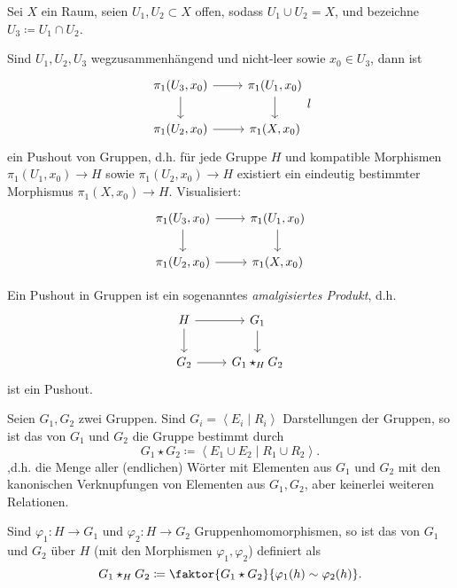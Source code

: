 \begin{theorem*}
    Sei $X$ ein Raum, seien  $U_1,U_2\subset X$ offen, sodass $U_1\cup U_2 = X$, und bezeichne  $U_3 \coloneqq  U_1 \cap U_2$.

    Sind $U_1,U_2,U_3$ wegzusammenhängend und nicht-leer sowie $x_0\in U_3$, dann ist
    \[
    \begin{tikzcd}
        \pi_1(U_3,x_0) \ar[swap]{d}{} \ar{r}{} & \pi_1(U_1,x_0) \ar{d}{} \\
        \pi_1(U_2,x_0) \ar[swap]{r}{} & \pi_1(X,x_0)
    \end{tikzcd}
    l\]
    ein Pushout von Gruppen, d.h. für jede Gruppe $H$ und kompatible Morphismen  $\pi_1(U_1,x_0) \to  H$ sowie $\pi_1(U_2,x_0) \to  H$ existiert ein eindeutig bestimmter Morphismus $\pi_1(X,x_0) \to  H$. Visualisiert:
    \[
    \begin{tikzcd}
        \pi_1(U_3,x_0) \ar[swap]{d}{} \ar{r}{} & \pi_1(U_1,x_0) \ar{d}{} \\
        \pi_1(U_2,x_0) \ar[swap]{r}{} & \pi_1(X,x_0)
    \end{tikzcd}
    \]
\end{theorem*}

\begin{remark}
    Ein Pushout in Gruppen ist ein sogenanntes \textit{amalgisiertes Produkt}, d.h.
    \[
    \begin{tikzcd}
        H \ar[swap]{d}{} \ar{r}{} & G_1 \ar{d}{} \\
        G_2 \ar[swap]{r}{} & G_1 \star_H G_2
    \end{tikzcd}
    \]
    ist ein Pushout.
\end{remark}

\begin{ddefinition}
    Seien $G_1,G_2$ zwei Gruppen. Sind $G_i = \left< E_i \mid  R_i \right> $ Darstellungen der Gruppen, so ist das  von $G_1$ und $G_2$ die Gruppe bestimmt durch
    \[
G_1 \star G_2 \coloneqq      \left< E_1 \cup E_2\mid R_1 \cup R_2 \right> 
    .\] 
    ,d.h. die Menge aller (endlichen) Wörter mit Elementen aus $G_1$ und $G_2$ mit den kanonischen Verknupfungen von Elementen aus $G_1,G_2$, aber keinerlei weiteren Relationen.

    Sind $\varphi_1\colon H \to  G_1$ und $\varphi_2\colon H\to G_2$ Gruppenhomomorphismen, so ist das  von $G_1$ und $G_2$ über $H$ (mit den Morphismen  $\varphi_1,\varphi_2$) definiert als
\[
    G_1\star_H G_2 \coloneqq  \faktor{G_1 \star G_2}{\varphi_1(h) \sim  \varphi_2(h)}
.\] 
\end{ddefinition}

